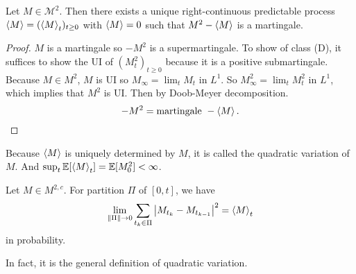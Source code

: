 \begin{cor}
    Let $M \in \mathcal{M}^2$. Then there exists a unique right-continuous predictable process $\left\langle M \right\rangle = (\left\langle M \right\rangle_t)_{t \geq 0}$ with $\left\langle M \right\rangle = 0$ such that $M^2 - \left\langle M \right\rangle$ is a martingale.
\end{cor}
\begin{proof}
    $M$ is a martingale so $-M^2$ is a supermartingale. To show of class (D), it suffices to show the UI of $(M_t^2)_{t \geq 0}$ because it is a positive submartingale. Because $M \in M^2$, $M$ is UI so $M_\infty = \lim_t M_t$ in $L^1$. So $M^2_\infty = \lim_t M_t^2$ in $L^1$, which implies that $M^2$ is UI. Then by Doob-Meyer decomposition.
    \begin{equation*}
    	-M^2 = \text{martingale } - \left\langle M \right\rangle. \qedhere
    \end{equation*}
\end{proof}
\begin{rmk}
    Because $\left\langle M \right\rangle$ is uniquely determined by $M$, it is called the quadratic variation of $M$. And $\sup_t \mathbb{E}[\left\langle M \right\rangle_t] = \mathbb{E}[M_0^2] < \infty$.
\end{rmk}

\begin{lem}
    Let $M \in M^{2,c}$. For partition $\Pi$ of $[0,t]$, we have
    \begin{equation*}
    	\lim_{\left\lVert\Pi\right\lVert \rightarrow 0} \sum_{t_k \in \Pi} \left\lvert M_{t_k} - M_{t_{k-1}}\right\lvert^2 = \left\langle M \right\rangle_t
    \end{equation*}
    in probability.
\end{lem}
\begin{rmk}
    In fact, it is the general definition of quadratic variation.
\end{rmk}

